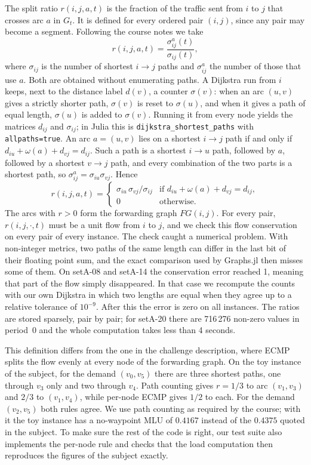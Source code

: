 \documentclass[11pt,a4paper]{article}
\begin{document}
The split ratio $r(i,j,a,t)$ is the fraction of the traffic sent from $i$ to $j$ that crosses arc
$a$ in $G_t$. It is defined for every ordered pair $(i,j)$, since any pair may become a segment.
Following the course notes we take
\begin{equation}
  r(i,j,a,t)=\frac{\sigma^a_{ij}(t)}{\sigma_{ij}(t)},
\end{equation}
where $\sigma_{ij}$ is the number of shortest $i\to j$ paths and $\sigma^a_{ij}$ the number of
those that use $a$. Both are obtained without enumerating paths. A Dijkstra run from $i$ keeps,
next to the distance label $d(v)$, a counter $\sigma(v)$: when an arc $(u,v)$ gives a strictly
shorter path, $\sigma(v)$ is reset to $\sigma(u)$, and when it gives a path of equal length,
$\sigma(u)$ is added to $\sigma(v)$. Running it from every node yields the matrices $d_{ij}$ and
$\sigma_{ij}$; in Julia this is \texttt{dijkstra\_shortest\_paths} with \texttt{allpaths=true}.
An arc $a=(u,v)$ lies on a shortest $i\to j$ path if and only if $d_{iu}+\omega(a)+d_{vj}=d_{ij}$.
Such a path is a shortest $i\to u$ path, followed by $a$, followed by a shortest $v\to j$ path, and
every combination of the two parts is a shortest path, so $\sigma^a_{ij}=\sigma_{iu}\sigma_{vj}$.
Hence
\begin{equation}
  r(i,j,a,t)=
  \begin{cases}
    \sigma_{iu}\,\sigma_{vj}/\sigma_{ij} & \text{if } d_{iu}+\omega(a)+d_{vj}=d_{ij},\\
    0 & \text{otherwise.}
  \end{cases}
\end{equation}
The arcs with $r>0$ form the forwarding graph $FG(i,j)$. For every pair, $r(i,j,\cdot,t)$ must be a
unit flow from $i$ to $j$, and we check this flow conservation on every pair of every instance.
The check caught a numerical problem. With non-integer metrics, two paths of the same length can
differ in the last bit of their floating point sum, and the exact comparison used by Graphs.jl then
misses some of them. On setA-08 and setA-14 the conservation error reached 1, meaning that part of
the flow simply disappeared. In that case we recompute the counts with our own Dijkstra in which
two lengths are equal when they agree up to a relative tolerance of $10^{-9}$. After this the error
is zero on all instances. The ratios are stored sparsely, pair by pair; for setA-20 there are
716\,276 non-zero values in period~0 and the whole computation takes less than 4 seconds.

This definition differs from the one in the challenge description, where ECMP splits the flow
evenly at every node of the forwarding graph. On the toy instance of the subject, for the demand
$(v_0,v_5)$ there are three shortest paths, one through $v_3$ only and two through $v_4$. Path
counting gives $r=1/3$ to arc $(v_1,v_3)$ and $2/3$ to $(v_1,v_4)$, while per-node ECMP gives $1/2$
to each. For the demand $(v_2,v_5)$ both rules agree. We use path counting as required by the
course; with it the toy instance has a no-waypoint MLU of $0.4167$ instead of the $0.4375$ quoted in
the subject. To make sure the rest of the code is right, our test suite also implements the per-node
rule and checks that the load computation then reproduces the figures of the subject exactly.
\end{document}

